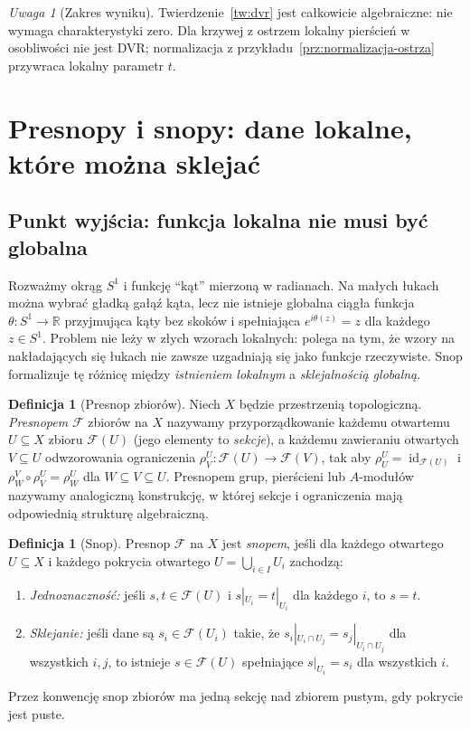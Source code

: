 \documentclass[11pt,a4paper,openany]{report}
\numberwithin{equation}{section}
\theoremstyle{plain}
\theoremstyle{definition}
\newtheorem{definicja}[twierdzenie]{Definicja}
\theoremstyle{remark}
\newtheorem{uwaga}[twierdzenie]{Uwaga}
\newcommand{\R}{\mathbb R}
\newcommand{\id}{\operatorname{id}}
\begin{document}
\begin{uwaga}[Zakres wyniku]
Twierdzenie~\ref{tw:dvr} jest całkowicie algebraiczne:
nie wymaga charakterystyki zero. Dla krzywej z ostrzem
lokalny pierścień w osobliwości nie jest DVR;
normalizacja z przykładu~\ref{prz:normalizacja-ostrza}
przywraca lokalny parametr $t$.
\end{uwaga}

\section{Presnopy i snopy: dane lokalne, które można sklejać}
\label{sec:snopy}

\subsection{Punkt wyjścia: funkcja lokalna nie musi być globalna}
Rozważmy okrąg $S^1$ i funkcję ``kąt'' mierzoną w radianach.
Na małych łukach można wybrać gładką gałąź kąta, lecz
nie istnieje globalna ciągła funkcja $\theta:S^1\to\R$
przyjmująca kąty bez skoków i spełniająca
$e^{i\theta(z)}=z$ dla każdego $z\in S^1$.
Problem nie leży w złych wzorach lokalnych: polega na tym,
że wzory na nakładających się łukach nie zawsze
uzgadniają się jako funkcje rzeczywiste. Snop formalizuje
tę różnicę między \emph{istnieniem lokalnym} a
\emph{sklejalnością globalną}.

\begin{definicja}[Presnop zbiorów]
Niech $X$ będzie przestrzenią topologiczną.
\emph{Presnopem} $\mathcal F$ zbiorów na $X$ nazywamy
przyporządkowanie każdemu otwartemu $U\subseteq X$
zbioru $\mathcal F(U)$ (jego elementy to \emph{sekcje}),
a każdemu zawieraniu otwartych $V\subseteq U$
odwzorowania ograniczenia
$\rho^U_V:\mathcal F(U)\to\mathcal F(V)$, tak aby
$\rho^U_U=\id_{\mathcal F(U)}$ i
$\rho^V_W\circ\rho^U_V=\rho^U_W$ dla $W\subseteq V\subseteq U$.
Presnopem grup, pierścieni lub $A$-modułów nazywamy
analogiczną konstrukcję, w której sekcje i ograniczenia
mają odpowiednią strukturę algebraiczną.
\end{definicja}

\begin{definicja}[Snop]
\label{def:snop}
Presnop $\mathcal F$ na $X$ jest \emph{snopem},
jeśli dla każdego otwartego $U\subseteq X$ i każdego
pokrycia otwartego $U=\bigcup_{i\in I}U_i$ zachodzą:
\begin{enumerate}[label=(S\arabic*)]
\item \emph{Jednoznaczność:} jeśli $s,t\in\mathcal F(U)$
i $s|_{U_i}=t|_{U_i}$ dla każdego $i$, to $s=t$.
\item \emph{Sklejanie:} jeśli dane są $s_i\in\mathcal F(U_i)$
takie, że $s_i|_{U_i\cap U_j}=s_j|_{U_i\cap U_j}$
dla wszystkich $i,j$, to istnieje $s\in\mathcal F(U)$
spełniające $s|_{U_i}=s_i$ dla wszystkich $i$.
\end{enumerate}
Przez konwencję snop zbiorów ma jedną sekcję nad
zbiorem pustym, gdy pokrycie jest puste.
\end{definicja}
\end{document}
